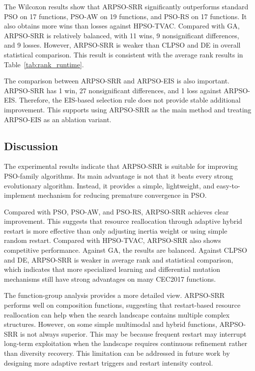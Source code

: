 \documentclass[conference]{IEEEtran}
\begin{document}
The Wilcoxon results show that ARPSO-SRR significantly outperforms standard PSO on 17 functions, PSO-AW on 19 functions, and PSO-RS on 17 functions. It also obtains more wins than losses against HPSO-TVAC. Compared with GA, ARPSO-SRR is relatively balanced, with 11 wins, 9 nonsignificant differences, and 9 losses. However, ARPSO-SRR is weaker than CLPSO and DE in overall statistical comparison. This result is consistent with the average rank results in Table~\ref{tab:rank_runtime}.

The comparison between ARPSO-SRR and ARPSO-EIS is also important. ARPSO-SRR has 1 win, 27 nonsignificant differences, and 1 loss against ARPSO-EIS. Therefore, the EIS-based selection rule does not provide stable additional improvement. This supports using ARPSO-SRR as the main method and treating ARPSO-EIS as an ablation variant.

\subsection{Discussion}
The experimental results indicate that ARPSO-SRR is suitable for improving PSO-family algorithms. Its main advantage is not that it beats every strong evolutionary algorithm. Instead, it provides a simple, lightweight, and easy-to-implement mechanism for reducing premature convergence in PSO.

Compared with PSO, PSO-AW, and PSO-RS, ARPSO-SRR achieves clear improvement. This suggests that resource reallocation through adaptive hybrid restart is more effective than only adjusting inertia weight or using simple random restart. Compared with HPSO-TVAC, ARPSO-SRR also shows competitive performance. Against GA, the results are balanced. Against CLPSO and DE, ARPSO-SRR is weaker in average rank and statistical comparison, which indicates that more specialized learning and differential mutation mechanisms still have strong advantages on many CEC2017 functions.

The function-group analysis provides a more detailed view. ARPSO-SRR performs well on composition functions, suggesting that restart-based resource reallocation can help when the search landscape contains multiple complex structures. However, on some simple multimodal and hybrid functions, ARPSO-SRR is not always superior. This may be because frequent restart may interrupt long-term exploitation when the landscape requires continuous refinement rather than diversity recovery. This limitation can be addressed in future work by designing more adaptive restart triggers and restart intensity control.
\end{document}
